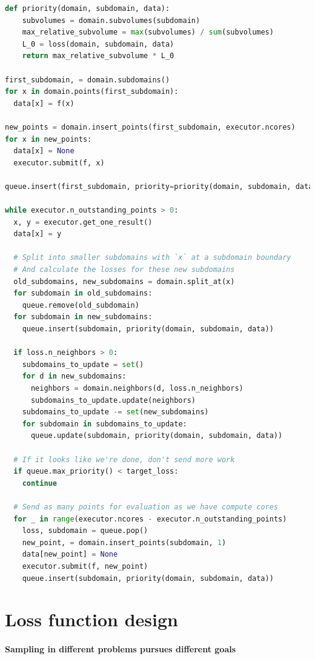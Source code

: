 \documentclass[english, twocolumn, 10pt, aps, superscriptaddress, floatfix, prb, citeautoscript]{revtex4-1}
\begin{document}
\begin{lstlisting}[language=Python]
def priority(domain, subdomain, data):
    subvolumes = domain.subvolumes(subdomain)
    max_relative_subvolume = max(subvolumes) / sum(subvolumes)
    L_0 = loss(domain, subdomain, data)
    return max_relative_subvolume * L_0

first_subdomain, = domain.subdomains()
for x in domain.points(first_subdomain):
  data[x] = f(x)

new_points = domain.insert_points(first_subdomain, executor.ncores)
for x in new_points:
  data[x] = None
  executor.submit(f, x)

queue.insert(first_subdomain, priority=priority(domain, subdomain, data))

while executor.n_outstanding_points > 0:
  x, y = executor.get_one_result()
  data[x] = y

  # Split into smaller subdomains with `x` at a subdomain boundary
  # And calculate the losses for these new subdomains
  old_subdomains, new_subdomains = domain.split_at(x)
  for subdomain in old_subdomains:
    queue.remove(old_subdomain)
  for subdomain in new_subdomains:
    queue.insert(subdomain, priority(domain, subdomain, data))

  if loss.n_neighbors > 0:
    subdomains_to_update = set()
    for d in new_subdomains:
      neighbors = domain.neighbors(d, loss.n_neighbors)
      subdomains_to_update.update(neighbors)
    subdomains_to_update -= set(new_subdomains)
    for subdomain in subdomains_to_update:
      queue.update(subdomain, priority(domain, subdomain, data))

  # If it looks like we're done, don't send more work
  if queue.max_priority() < target_loss:
    continue

  # Send as many points for evaluation as we have compute cores
  for _ in range(executor.ncores - executor.n_outstanding_points)
    loss, subdomain = queue.pop()
    new_point, = domain.insert_points(subdomain, 1)
    data[new_point] = None
    executor.submit(f, new_point)
    queue.insert(subdomain, priority(domain, subdomain, data))
\end{lstlisting}

\section{Loss function design}

\paragraph{Sampling in different problems pursues different goals}
\end{document}
